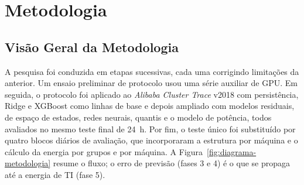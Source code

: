 \documentclass[a4paper,12pt]{article}
\begin{document}

\section{Metodologia}

\subsection{Visão Geral da Metodologia}

A pesquisa foi conduzida em etapas sucessivas, cada uma corrigindo limitações da anterior. Um ensaio preliminar de protocolo usou uma série auxiliar de GPU. Em seguida, o protocolo foi aplicado ao \textit{Alibaba Cluster Trace} v2018 com persistência, Ridge e XGBoost como linhas de base e depois ampliado com modelos residuais, de espaço de estados, redes neurais, quantis e o modelo de potência, todos avaliados no mesmo teste final de 24~h. Por fim, o teste único foi substituído por quatro blocos diários de avaliação, que incorporaram a estrutura por máquina e o cálculo da energia por grupos e por máquina. A Figura~\ref{fig:diagrama-metodologia} resume o fluxo; o erro de previsão (fases 3 e 4) é o que se propaga até a energia de TI (fase 5).
\end{document}
